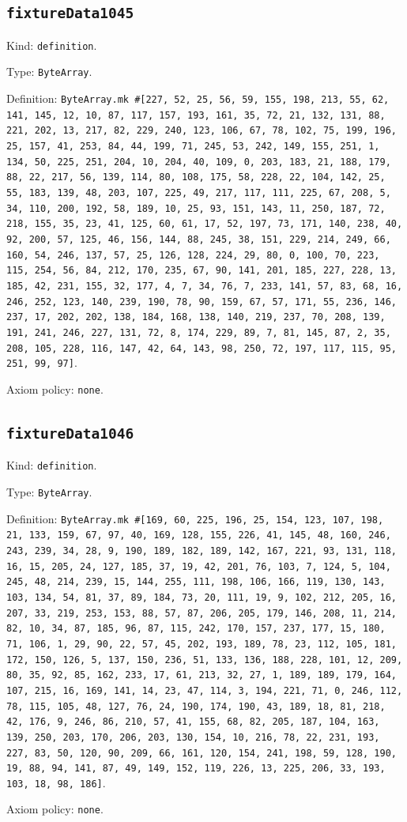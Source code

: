 \documentclass[11pt]{article}
\begin{document}
\subsection*{\texttt{fixtureData1045}}
\noindent Kind: \texttt{definition}.\par
\noindent Type: \texttt{ByteArray}.\par
\noindent Definition: \texttt{ByteArray.mk \#[227, 52, 25, 56, 59, 155, 198, 213, 55, 62, 141, 145, 12, 10, 87, 117, 157, 193, 161, 35, 72, 21, 132, 131, 88, 221, 202, 13, 217, 82, 229, 240, 123, 106, 67, 78, 102, 75, 199, 196, 25, 157, 41, 253, 84, 44, 199, 71, 245, 53, 242, 149, 155, 251, 1, 134, 50, 225, 251, 204, 10, 204, 40, 109, 0, 203, 183, 21, 188, 179, 88, 22, 217, 56, 139, 114, 80, 108, 175, 58, 228, 22, 104, 142, 25, 55, 183, 139, 48, 203, 107, 225, 49, 217, 117, 111, 225, 67, 208, 5, 34, 110, 200, 192, 58, 189, 10, 25, 93, 151, 143, 11, 250, 187, 72, 218, 155, 35, 23, 41, 125, 60, 61, 17, 52, 197, 73, 171, 140, 238, 40, 92, 200, 57, 125, 46, 156, 144, 88, 245, 38, 151, 229, 214, 249, 66, 160, 54, 246, 137, 57, 25, 126, 128, 224, 29, 80, 0, 100, 70, 223, 115, 254, 56, 84, 212, 170, 235, 67, 90, 141, 201, 185, 227, 228, 13, 185, 42, 231, 155, 32, 177, 4, 7, 34, 76, 7, 233, 141, 57, 83, 68, 16, 246, 252, 123, 140, 239, 190, 78, 90, 159, 67, 57, 171, 55, 236, 146, 237, 17, 202, 202, 138, 184, 168, 138, 140, 219, 237, 70, 208, 139, 191, 241, 246, 227, 131, 72, 8, 174, 229, 89, 7, 81, 145, 87, 2, 35, 208, 105, 228, 116, 147, 42, 64, 143, 98, 250, 72, 197, 117, 115, 95, 251, 99, 97]}.\par
\noindent Axiom policy: \texttt{none}.\par
\subsection*{\texttt{fixtureData1046}}
\noindent Kind: \texttt{definition}.\par
\noindent Type: \texttt{ByteArray}.\par
\noindent Definition: \texttt{ByteArray.mk \#[169, 60, 225, 196, 25, 154, 123, 107, 198, 21, 133, 159, 67, 97, 40, 169, 128, 155, 226, 41, 145, 48, 160, 246, 243, 239, 34, 28, 9, 190, 189, 182, 189, 142, 167, 221, 93, 131, 118, 16, 15, 205, 24, 127, 185, 37, 19, 42, 201, 76, 103, 7, 124, 5, 104, 245, 48, 214, 239, 15, 144, 255, 111, 198, 106, 166, 119, 130, 143, 103, 134, 54, 81, 37, 89, 184, 73, 20, 111, 19, 9, 102, 212, 205, 16, 207, 33, 219, 253, 153, 88, 57, 87, 206, 205, 179, 146, 208, 11, 214, 82, 10, 34, 87, 185, 96, 87, 115, 242, 170, 157, 237, 177, 15, 180, 71, 106, 1, 29, 90, 22, 57, 45, 202, 193, 189, 78, 23, 112, 105, 181, 172, 150, 126, 5, 137, 150, 236, 51, 133, 136, 188, 228, 101, 12, 209, 80, 35, 92, 85, 162, 233, 17, 61, 213, 32, 27, 1, 189, 189, 179, 164, 107, 215, 16, 169, 141, 14, 23, 47, 114, 3, 194, 221, 71, 0, 246, 112, 78, 115, 105, 48, 127, 76, 24, 190, 174, 190, 43, 189, 18, 81, 218, 42, 176, 9, 246, 86, 210, 57, 41, 155, 68, 82, 205, 187, 104, 163, 139, 250, 203, 170, 206, 203, 130, 154, 10, 216, 78, 22, 231, 193, 227, 83, 50, 120, 90, 209, 66, 161, 120, 154, 241, 198, 59, 128, 190, 19, 88, 94, 141, 87, 49, 149, 152, 119, 226, 13, 225, 206, 33, 193, 103, 18, 98, 186]}.\par
\noindent Axiom policy: \texttt{none}.\par
\end{document}
